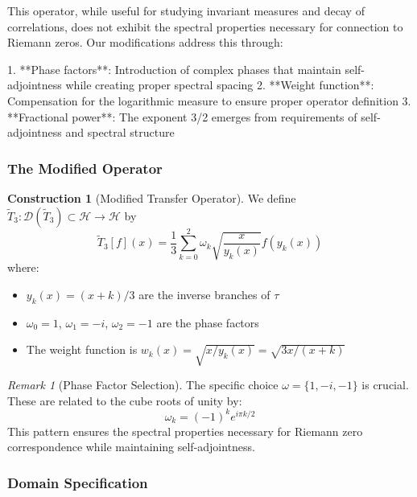 \documentclass[12pt,letterpaper]{article}
\theoremstyle{plain}
\theoremstyle{definition}
\newtheorem{construction}[theorem]{Construction}
\theoremstyle{remark}
\newtheorem{remark}[theorem]{Remark}
\newcommand{\hilbert}{\mathcal{H}}
\newcommand{\domain}{\mathcal{D}}
\newcommand{\modifiedop}{\tilde{T}_3}
\begin{document}
This operator, while useful for studying invariant measures and decay of correlations, does not exhibit the spectral properties necessary for connection to Riemann zeros. Our modifications address this through:

1. **Phase factors**: Introduction of complex phases that maintain self-adjointness while creating proper spectral spacing
2. **Weight function**: Compensation for the logarithmic measure to ensure proper operator definition
3. **Fractional power**: The exponent 3/2 emerges from requirements of self-adjointness and spectral structure

\subsubsection{The Modified Operator}

\begin{construction}[Modified Transfer Operator]\label{const:modified_op}
We define $\modifiedop: \domain(\modifiedop) \subset \hilbert \to \hilbert$ by
\begin{equation}\label{eq:modified_op}
\modifiedop[f](x) = \frac{1}{3}\sum_{k=0}^{2} \omega_k \sqrt{\frac{x}{y_k(x)}} f(y_k(x))
\end{equation}
where:
\begin{itemize}
\item $y_k(x) = (x+k)/3$ are the inverse branches of $\tau$
\item $\omega_0 = 1$, $\omega_1 = -i$, $\omega_2 = -1$ are the phase factors
\item The weight function is $w_k(x) = \sqrt{x/y_k(x)} = \sqrt{3x/(x+k)}$
\end{itemize}
\end{construction}

\begin{remark}[Phase Factor Selection]\label{rem:phases}
The specific choice $\omega = \{1, -i, -1\}$ is crucial. These are related to the cube roots of unity by:
\begin{equation}
\omega_k = (-1)^k e^{i\pi k/2}
\end{equation}
This pattern ensures the spectral properties necessary for Riemann zero correspondence while maintaining self-adjointness.
\end{remark}

\subsubsection{Domain Specification}
\end{document}
